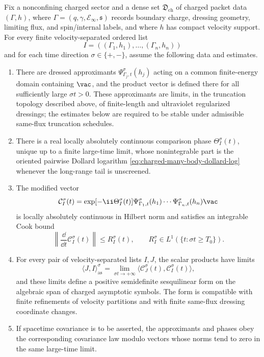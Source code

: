 \begin{hypothesis}
\label{hyp:charged-dollard-cook-package}
Fix a nonconfining charged sector and a dense set
\(\mathfrak D_{\mathrm{ch}}\) of charged packet data
\((\Gamma,h)\), where \(\Gamma=(q,\gamma,\mathcal E_\infty,\mathfrak s)\)
records boundary charge, dressing geometry, limiting flux, and spin/internal
labels, and where \(h\) has compact velocity support.  For every finite
velocity-separated ordered list
\[
  I=((\Gamma_1,h_1),\ldots,(\Gamma_n,h_n))
\]
and for each time direction \(\sigma\in\{+,-\}\), assume the following data
and estimates.
\begin{enumerate}
\item There are dressed approximants
\(\Psi_{\Gamma_j,t}^{\sigma}(h_j)\) acting on a common finite-energy domain
containing \(\vac\), and the product vector is defined there for all
sufficiently large \(\sigma t>0\).  These approximants are limits, in the
truncation topology described above, of finite-length and ultraviolet
regularized dressings; the estimates below are required to be stable under
admissible same-flux truncation schedules.
\item There is a real locally absolutely continuous comparison phase
\(\Theta_I^\sigma(t)\), unique up to a finite large-time limit, whose
nonintegrable part is the oriented pairwise Dollard logarithm
\eqref{eq:charged-many-body-dollard-log} whenever the long-range tail is
unscreened.
\item The modified vector
\[
  \mathcal C_I^\sigma(t)
  =
  \exp[-\ii\Theta_I^\sigma(t)]
  \Psi_{\Gamma_1,t}^{\sigma}(h_1)\cdots
  \Psi_{\Gamma_n,t}^{\sigma}(h_n)\vac
\]
is locally absolutely continuous in Hilbert norm and satisfies an integrable
Cook bound
\begin{equation}
  \left\|
    \frac{\dd}{\dd t}\mathcal C_I^\sigma(t)
  \right\|
  \le R_I^\sigma(t),
  \qquad
  R_I^\sigma\in L^1(\{t:\sigma t\ge T_0\}).
  \label{eq:charged-dollard-cook-package-integrable-derivative}
\end{equation}
\item For every pair of velocity-separated lists \(I,J\), the scalar products
have limits
\begin{equation}
  \langle J,I\rangle_{\mathrm{as}}^\sigma
  =
  \lim_{\sigma t\to+\infty}
  \langle
    \mathcal C_J^\sigma(t),
    \mathcal C_I^\sigma(t)
  \rangle ,
  \label{eq:charged-dollard-cook-asymptotic-inner-product}
\end{equation}
and these limits define a positive semidefinite sesquilinear form on the
algebraic span of charged asymptotic symbols.  The form is compatible with
finite refinements of velocity partitions and with finite same-flux dressing
coordinate changes.
\item If spacetime covariance is to be asserted, the approximants and phases
obey the corresponding covariance law modulo vectors whose norms tend to
zero in the same large-time limit.
\end{enumerate}
\end{hypothesis}

